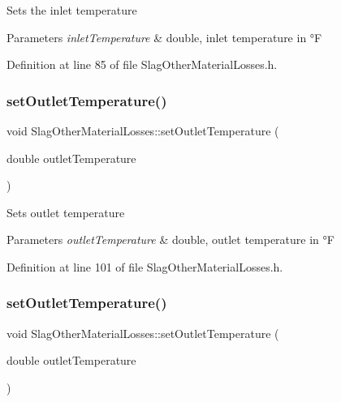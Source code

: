 Sets the inlet temperature 
\begin{DoxyParams}{Parameters}
{\em inlet\+Temperature} & double, inlet temperature in °F \\
\hline
\end{DoxyParams}


Definition at line 85 of file Slag\+Other\+Material\+Losses.\+h.

\mbox{\label{class_slag_other_material_losses_afae6aafff94d02926135fabf20a87070}} 
\subsubsection{\texorpdfstring{set\+Outlet\+Temperature()}{setOutletTemperature()}\hspace{0.1cm}{\footnotesize\ttfamily [1/3]}}
{\footnotesize\ttfamily void Slag\+Other\+Material\+Losses\+::set\+Outlet\+Temperature (\begin{DoxyParamCaption}\item[{double}]{outlet\+Temperature }\end{DoxyParamCaption})\hspace{0.3cm}{\ttfamily [inline]}}

Sets outlet temperature 
\begin{DoxyParams}{Parameters}
{\em outlet\+Temperature} & double, outlet temperature in °F \\
\hline
\end{DoxyParams}


Definition at line 101 of file Slag\+Other\+Material\+Losses.\+h.

\mbox{\label{class_slag_other_material_losses_afae6aafff94d02926135fabf20a87070}} 
\subsubsection{\texorpdfstring{set\+Outlet\+Temperature()}{setOutletTemperature()}\hspace{0.1cm}{\footnotesize\ttfamily [2/3]}}
{\footnotesize\ttfamily void Slag\+Other\+Material\+Losses\+::set\+Outlet\+Temperature (\begin{DoxyParamCaption}\item[{double}]{outlet\+Temperature }\end{DoxyParamCaption})\hspace{0.3cm}{\ttfamily [inline]}}

